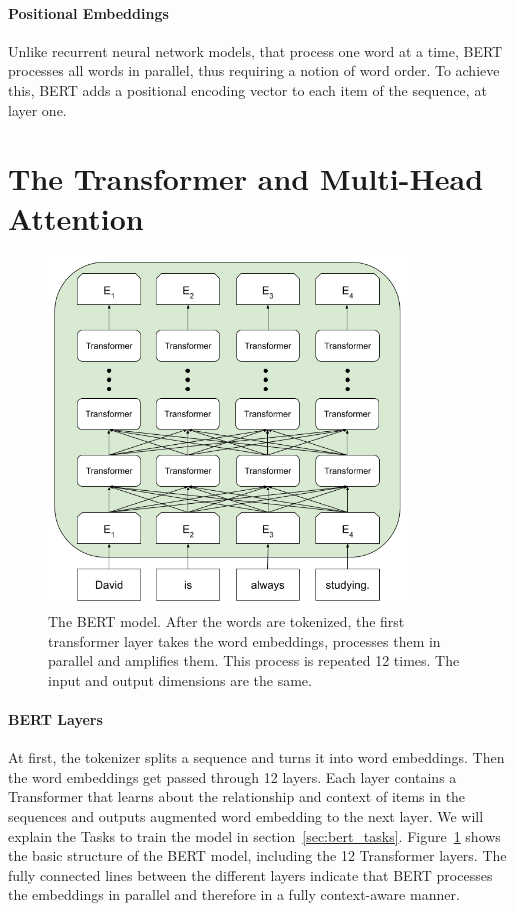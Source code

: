 \paragraph{Positional Embeddings}
Unlike recurrent neural network models, that process one word at a time, BERT processes all words in parallel, thus requiring a notion of word order. To achieve this, BERT adds a positional encoding vector to each item of the sequence, at layer one.


\section{The Transformer and Multi-Head Attention}
\label{sec:transformer}

\begin{figure}[htbp]
\centering
\includegraphics[width=0.85\textwidth]{images/diagrams/bert_layers.png}
\caption{The BERT model. After the words are tokenized, the first transformer layer takes the word embeddings, processes them in parallel and amplifies them. This process is repeated 12 times. The input and output dimensions are the same.}
\label{fig:bert_layers}
\end{figure}

\paragraph{BERT Layers}
At first, the tokenizer splits a sequence and turns it into word embeddings. Then the word embeddings get passed through 12 layers.
Each layer contains a Transformer that learns about the relationship and context of items in the sequences and outputs augmented word embedding to the next layer. We will explain the Tasks to train the model in section~\ref{sec:bert_tasks}. Figure~\ref{fig:bert_layers} shows the basic structure of the BERT model, including the 12 Transformer layers. The fully connected lines between the different layers indicate that BERT processes the embeddings in parallel and therefore in a fully context-aware manner.

